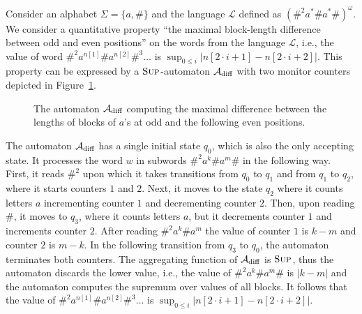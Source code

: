 \documentclass{lmcs}
\newcommand{\lang}{\mathcal{L}}
\newcommand{\fsup}{\textsc{Sup}}
\begin{document}
\begin{exa}\label{ex:AMC}
Consider an alphabet $\Sigma = \{a,\#\}$ and the language $\lang$ defined as ${(\#^2 a^* \# a^* \#)}^{\omega}$.
We consider a quantitative property ``the maximal block-length difference between odd and even positions'' on the words from the language $\lang$, i.e.,
the value of word $\#^2 a^{n[1]} \# a^{n[2]} \#^3 \ldots $ is $\sup_{0 \leq i} |n[2\cdot i+1] - n[2\cdot i+2]|$.
This property can be expressed by a $\fsup$-automaton $\mathcal{A}_{\textrm{diff}}$ with two monitor counters depicted in Figure~\ref{fig:autDiff}.

\begin{figure}
\begin{center}
\end{center}
\caption{The automaton $\mathcal{A}_{\textrm{diff}}$ computing the maximal difference between the lengths of blocks of $a$'s at odd and the following even positions.}\label{fig:autDiff}
\end{figure}

The automaton $\mathcal{A}_{\textrm{diff}}$ has a single initial state $q_0$, which is also the only accepting state.
It processes the word $w$ in subwords $\#^2 a^{k} \# a^{m} \#$ in the following way.
First, it reads $\#^2$ upon which it takes transitions from $q_0$ to $q_1$ and from $q_1$ to $q_2$, where it  starts counters $1$ and $2$.
Next, it moves to the state $q_2$ where it counts letters $a$ incrementing counter $1$ and decrementing counter $2$.
Then, upon reading $\#$, it moves to $q_3$, where it counts letters $a$, but it decrements counter $1$ and increments counter $2$.
After reading $\#^2 a^{k} \# a^{m}$ the value of counter $1$ is $k-m$ and counter $2$ is $m-k$.
In the following transition from $q_3$ to $q_0$, the automaton terminates both counters.
The aggregating function  of $\mathcal{A}_{\textrm{diff}}$ is $\fsup$, thus the automaton discards the lower value, i.e.,
the value of $\#^2 a^{k} \# a^{m} \#$ is $|k-m|$ and the automaton computes the supremum over values of all blocks.
It follows that the value of $\#^2 a^{n[1]} \# a^{n[2]} \#^3 \ldots $ is $\sup_{0 \leq i} |n[2\cdot i+1] - n[2\cdot i+2]|$.
\end{exa}
\end{document}
